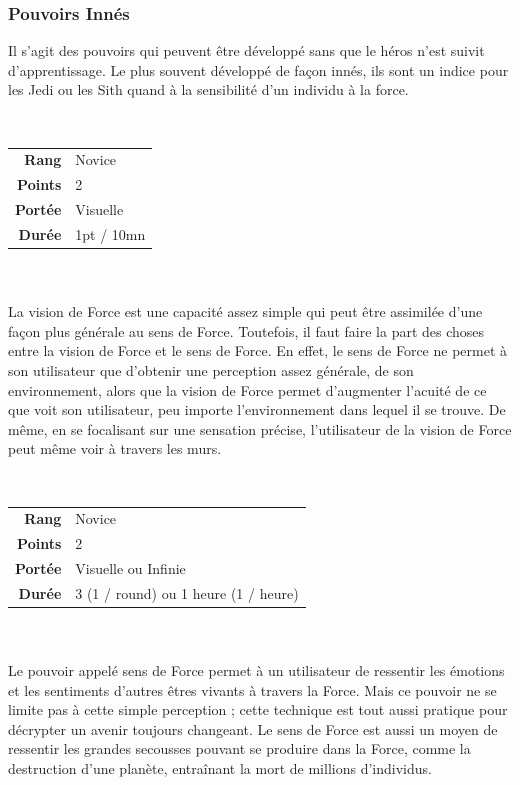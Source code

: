 \subsubsection{Pouvoirs Innés}
Il s’agit des pouvoirs qui peuvent être développé sans que le héros n’est suivit d’apprentissage. Le plus souvent développé de façon innés, ils sont un indice pour les Jedi ou les Sith quand à la sensibilité d’un individu à la force.

\begin{description}[align=left] 
    \item [Vision de Force] ~ \\

        \begin{tabular}{ r l }
            \textbf{Rang}    & Novice \\
            \textbf{Points}  & 2 \\
            \textbf{Portée}  & Visuelle \\
            \textbf{Durée}   & 1pt / 10mn \\
        \end{tabular}
        \\ \\
        La vision de Force est une capacité assez simple qui peut être assimilée d’une façon plus générale au sens de Force. Toutefois, il faut faire la part des choses entre la vision de Force et le sens de Force. En effet, le sens de Force ne permet à son utilisateur que d’obtenir une perception assez générale, de son environnement, alors que la vision de Force permet d’augmenter l’acuité de ce que voit son utilisateur, peu importe l’environnement dans lequel il se trouve. De même, en se focalisant sur une sensation précise, l’utilisateur de la vision de Force peut même voir à travers les murs.
        \\

    \item [Sens de Force] ~ \\

        \begin{tabular}{ r l }
            \textbf{Rang}    & Novice \\
            \textbf{Points}  & 2 \\
            \textbf{Portée}  & Visuelle ou Infinie \\
            \textbf{Durée}   & 3 (1 / round) ou 1 heure (1 / heure) \\
        \end{tabular}
        \\ \\
        Le pouvoir appelé sens de Force permet à un utilisateur de ressentir les émotions et les sentiments d’autres êtres vivants à travers la Force. Mais ce pouvoir ne se limite pas à cette simple perception ; cette technique est tout aussi pratique pour décrypter un avenir toujours changeant. Le sens de Force est aussi un moyen de ressentir les grandes secousses pouvant se produire dans la Force, comme la destruction d’une planète, entraînant la mort de millions d’individus. 


\end{description}
